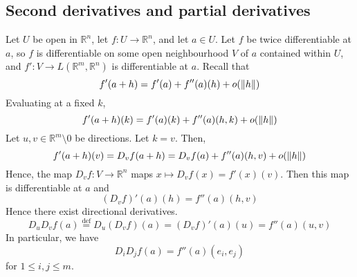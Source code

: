 \subsection{Second derivatives and partial derivatives}
Let \( U \) be open in \( \mathbb R^n \), let \( f \colon U \to \mathbb R^n \), and let \( a \in U \).
Let \( f \) be twice differentiable at \( a \), so \( f \) is differentiable on some open neighbourhood \( V \) of \( a \) contained within \( U \), and \( f' \colon V \to L(\mathbb R^m, \mathbb R^n) \) is differentiable at \( a \).
Recall that
\[
	f'(a+h) = f'(a) + f''(a)(h) + o\qty(\norm{h})
\]
Evaluating at a fixed \( k \),
\[
	f'(a+h)(k) = f'(a)(k) + f''(a)(h,k) + o\qty(\norm{h})
\]
Let \( u, v \in \mathbb R^m \setminus \qty{0} \) be directions.
Let \( k = v \).
Then,
\[
	f'(a+h)(v) = D_v f(a+h) = D_v f(a) + f''(a)(h,v) + o\qty(\norm{h})
\]
Hence, the map \( D_v f \colon V \to \mathbb R^n \) maps \( x \mapsto D_v f(x) = f'(x)(v) \).
Then this map is differentiable at \( a \) and
\[
	(D_v f)'(a)(h) = f''(a)(h,v)
\]
Hence there exist directional derivatives.
\[
	D_u D_v f(a) \overset{\mathrm{def}}{=} D_u (D_v f)(a) = (D_v f)'(a)(u) = f''(a)(u,v)
\]
In particular, we have
\[
	D_i D_j f(a) = f''(a)(e_i, e_j)
\]
for \( 1 \leq i, j \leq m \).

